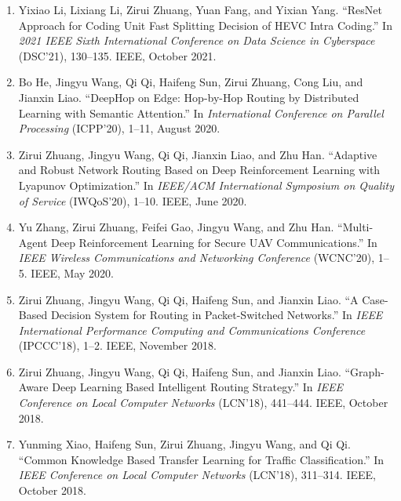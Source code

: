 \documentclass[letterpaper,11pt]{article}
\newcommand{\contentlength}{5.5in}
\begin{document}
\begin{tcolorbox}[flush right,breakable,colback=white,colframe=white,width=\contentlength]
\begin{enumerate}[itemsep=0mm]
			\item Yixiao Li, Lixiang Li, Zirui Zhuang, Yuan Fang, and Yixian Yang. “ResNet Approach for Coding Unit Fast Splitting Decision of HEVC Intra Coding.” In \textit{2021 IEEE Sixth International Conference on Data Science in Cyberspace} (DSC'21), 130–135. IEEE, October 2021.
			\item Bo He, Jingyu Wang, Qi Qi, Haifeng Sun, Zirui Zhuang, Cong Liu, and Jianxin Liao. “DeepHop on Edge: Hop-by-Hop Routing by Distributed Learning with Semantic Attention.” In \textit{International Conference on Parallel Processing} (ICPP'20), 1–11, August 2020.
			\item Zirui Zhuang, Jingyu Wang, Qi Qi, Jianxin Liao, and Zhu Han. “Adaptive and Robust Network Routing Based on Deep Reinforcement Learning with Lyapunov Optimization.” In \textit{IEEE/ACM International Symposium on Quality of Service} (IWQoS'20), 1–10. IEEE, June 2020.
			\item Yu Zhang, Zirui Zhuang, Feifei Gao, Jingyu Wang, and Zhu Han. “Multi-Agent Deep Reinforcement Learning for Secure UAV Communications.” In \textit{IEEE Wireless Communications and Networking Conference} (WCNC'20), 1–5. IEEE, May 2020.
			\item Zirui Zhuang, Jingyu Wang, Qi Qi, Haifeng Sun, and Jianxin Liao. “A Case-Based Decision System for Routing in Packet-Switched Networks.” In \textit{IEEE International Performance Computing and Communications Conference} (IPCCC'18), 1–2. IEEE, November 2018.
			\item Zirui Zhuang, Jingyu Wang, Qi Qi, Haifeng Sun, and Jianxin Liao. “Graph-Aware Deep Learning Based Intelligent Routing Strategy.” In \textit{IEEE Conference on Local Computer Networks} (LCN'18), 441–444. IEEE, October 2018.
			\item Yunming Xiao, Haifeng Sun, Zirui Zhuang, Jingyu Wang, and Qi Qi. “Common Knowledge Based Transfer Learning for Traffic Classification.” In \textit{IEEE Conference on Local Computer Networks} (LCN'18), 311–314. IEEE, October 2018.
		\end{enumerate}
		
	\end{tcolorbox}

	
	
	
	
\end{document}
